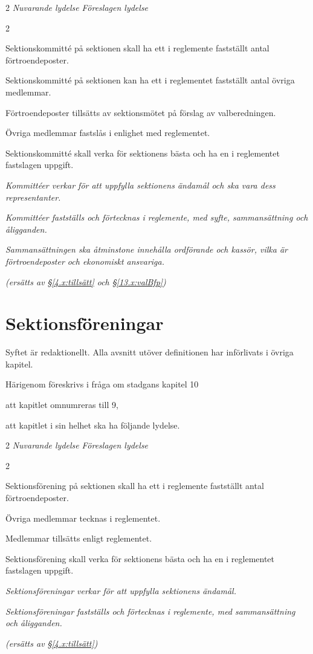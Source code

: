\documentclass{article}
\newenvironment{lydelse}
    {\begin{paracol}{2}%
        \emph{Nuvarande lydelse}%
        \switchcolumn%
        \emph{Föreslagen lydelse}%
    \end{paracol}%
    \begin{enumerate}[label=\thesubsection.\arabic*]%
    \begin{paracol}{2}%
    }{\end{paracol}\end{enumerate}}
\begin{document}
\begin{lydelse}
\setcounter{section}{9}
\setcounter{subsection}{1}
  \item Sektionskommitté på sektionen skall ha ett i reglemente fastställt antal förtroendeposter.
  \item Sektionskommitté på sektionen kan ha ett i reglementet fastställt antal övriga medlemmar.
  \item Förtroendeposter tillsätts av sektionsmötet på förslag av valberedningen.
  \item Övriga medlemmar fastslås i enlighet med reglementet.
  \item Sektionskommitté skall verka för sektionens bästa och ha en i reglementet fastslagen uppgift.
\switchcolumn
  \setcounter{section}{8}
  \item \emph{Kommittéer verkar för att uppfylla sektionens ändamål och ska vara dess representanter.}
  \item \emph{Kommittéer fastställs och förtecknas i reglemente, med syfte, sammansättning och åligganden.}
  \item \emph{Sammansättningen ska åtminstone innehålla ordförande och kassör, vilka är förtroendeposter och ekonomiskt ansvariga.}
  \item[] \emph{(ersätts av \S\ref{4.x:tillsätt} och \S\ref{13.x:valBfp})}
\end{lydelse}
\setcounter{section}{8}

\section{Sektionsföreningar}
Syftet är redaktionellt.
Alla avsnitt utöver definitionen har införlivats i övriga kapitel.

Härigenom föreskrivs i fråga om stadgans kapitel 10
\begin{dels}
\item att kapitlet omnumreras till 9,
\item att kapitlet i sin helhet ska ha följande lydelse.
\end{dels}

\begin{lydelse}
\setcounter{section}{10}
\setcounter{subsection}{1}
  \item Sektionsförening på sektionen skall ha ett i reglemente fastställt antal förtroendeposter.
  \item Övriga medlemmar tecknas i reglementet.
  \item Medlemmar tillsätts enligt reglementet.
  \item Sektionsförening skall verka för sektionens bästa och ha en i reglementet fastslagen uppgift.
\switchcolumn
  \setcounter{section}{9}
  \item \emph{Sektionsföreningar verkar för att uppfylla sektionens ändamål.}
  \item \emph{Sektionsföreningar fastställs och förtecknas i reglemente, med sammansättning och åligganden.}
  \item[] \emph{(ersätts av \S\ref{4.x:tillsätt})}
\end{lydelse}
\setcounter{section}{9}
\end{document}

